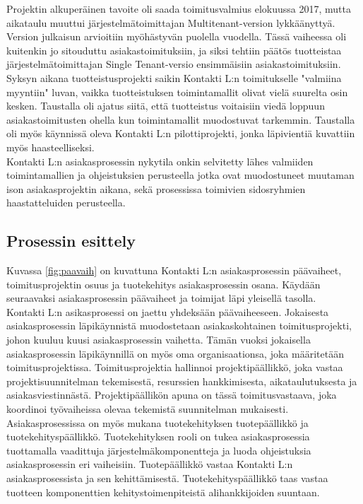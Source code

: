 \documentclass[finnish,12pt,a4paper,pdftex]{article}
\begin{document}
\noindent  Projektin alkuperäinen tavoite oli saada toimitusvalmius elokuussa 2017, mutta aikataulu muuttui järjestelmätoimittajan Multitenant-version lykkäänyttyä. Version julkaisun arvioitiin myöhästyvän puolella vuodella. Tässä vaiheessa oli kuitenkin jo sitouduttu asiakastoimituksiin, ja siksi tehtiin päätös tuotteistaa järjestelmätoimittajan Single Tenant-versio ensimmäisiin asiakastoimituksiin. Syksyn aikana tuotteistusprojekti saikin Kontakti L:n toimitukselle "valmiina myyntiin" luvan, vaikka tuotteistuksen toimintamallit olivat vielä suurelta osin kesken. Taustalla oli ajatus siitä, että tuotteistus voitaisiin viedä loppuun asiakastoimitusten ohella kun toimintamallit muodostuvat tarkemmin. Taustalla oli myös käynnissä oleva Kontakti L:n pilottiprojekti, jonka läpivientiä kuvattiin myös haasteelliseksi.\\

Kontakti L:n asiakasprosessin nykytila onkin selvitetty lähes valmiiden toimintamallien ja ohjeistuksien perusteella jotka ovat muodostuneet muutaman ison asiakasprojektin aikana, sekä prosessissa toimivien sidosryhmien haastatteluiden perusteella.

\subsection{Prosessin esittely}

Kuvassa \ref{fig:paavaih} on kuvattuna Kontakti L:n asiakasprosessin päävaiheet, toimitusprojektin osuus ja tuotekehitys asiakasprosessin osana. Käydään seuraavaksi asiakasprosessin päävaiheet ja toimijat läpi yleisellä tasolla.\\

Kontakti L:n asikasprosessi on jaettu yhdeksään päävaiheeseen. Jokaisesta asiakasprosessin läpikäynnistä muodostetaan asiakaskohtainen toimitusprojekti, johon kuuluu kuusi  asiakasprosessin vaihetta. Tämän vuoksi jokaisella asiakasprosessin läpikäynnillä on myös oma organisaationsa, joka määritetään toimitusprojektissa. Toimitusprojektia hallinnoi projektipäällikkö, joka vastaa projektisuunnitelman tekemisestä, resurssien hankkimisesta, aikataulutuksesta ja asiakasviestinnästä. Projektipäällikön apuna on tässä toimitusvastaava, joka koordinoi työvaiheissa olevaa tekemistä suunnitelman mukaisesti.\\

\noindent Asiakasprosessissa on myös mukana tuotekehityksen tuotepäällikkö ja tuotekehityspäällikkö. Tuotekehityksen rooli on tukea asiakasprosessia tuottamalla vaadittuja järjestelmäkomponentteja ja luoda ohjeistuksia asiakasprosessin eri vaiheisiin. Tuotepäällikkö vastaa Kontakti L:n asiakasprosessista ja sen kehittämisestä. Tuotekehityspäällikkö taas vastaa tuotteen komponenttien kehitystoimenpiteistä alihankkijoiden suuntaan.\\
\end{document}
